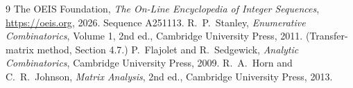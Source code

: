 \documentclass[11pt,a4paper]{article}
\theoremstyle{plain}
\theoremstyle{definition}
\begin{document}
\begin{thebibliography}{9}
 The OEIS Foundation, \emph{The On-Line Encyclopedia of Integer
Sequences}, \url{https://oeis.org}, 2026. Sequence A251113.
 R.~P.~Stanley, \emph{Enumerative Combinatorics}, Volume 1, 2nd ed.,
Cambridge University Press, 2011. (Transfer-matrix method, Section 4.7.)
 P.~Flajolet and R.~Sedgewick, \emph{Analytic Combinatorics}, Cambridge
University Press, 2009.
 R.~A.~Horn and C.~R.~Johnson, \emph{Matrix Analysis}, 2nd ed., Cambridge
University Press, 2013.
\end{thebibliography}
\end{document}
